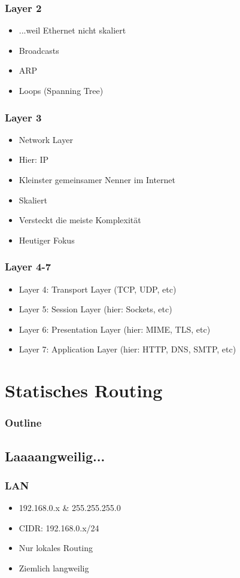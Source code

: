 \documentclass[t]{beamer}
\begin{document}
\begin{frame}
	\frametitle{Layer 2}
	\begin{itemize}
		\item ...weil Ethernet nicht skaliert
		\item Broadcasts
		\item ARP
		\item Loops (Spanning Tree)
	\end{itemize}
\end{frame}

\begin{frame}
	\frametitle{Layer 3}
	\begin{itemize}
		\item Network Layer
		\item Hier: IP
		\item Kleinster gemeinsamer Nenner im Internet
		\item Skaliert
		\item Versteckt die meiste Komplexit\"at
		\item Heutiger Fokus
	\end{itemize}
\end{frame}

\begin{frame}
	\frametitle{Layer 4-7}
	\begin{itemize}
		\item Layer 4: Transport Layer (TCP, UDP, etc)
		\item Layer 5: Session Layer (hier: Sockets, etc)
		\item Layer 6: Presentation Layer (hier: MIME, TLS, etc)
		\item Layer 7: Application Layer (hier: HTTP, DNS, SMTP, etc)
	\end{itemize}
\end{frame}

\section{Statisches Routing}

\begin{frame}
	\frametitle{Outline}
	\tableofcontents[currentsection]
\end{frame}

\subsection{Laaaangweilig...}

\begin{frame}
	\frametitle{LAN}
	\begin{itemize}
		\item 192.168.0.x \& 255.255.255.0
		\item CIDR: 192.168.0.x/24
		\item Nur lokales Routing
		\item Ziemlich langweilig
	\end{itemize}
\end{frame}
\end{document}
